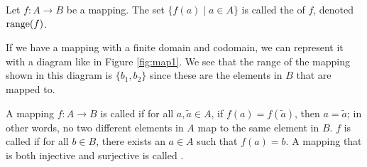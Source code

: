 \begin{definition}
Let $ f:A\to B $ be a mapping. The set $ \{f(a)\mid a\in A\} $ is called the  of $ f $, denoted $ \operatorname{range}(f) $.
\end{definition}

\begin{SCfigure}[0.8][hb]
\centering
{}
\caption{An example of a mapping from $ A=\{a_1,a_2,a_3\} $ to $ B=\{b_1,b_2,b_3\} $}
\label{fig:map1}
\end{SCfigure}

If we have a mapping with a finite domain and codomain, we can represent it with a diagram like in Figure \ref{fig:map1}. We see that the range of the mapping shown in this diagram is $ \{b_1,b_2\} $ since these are the elements in $ B $ that are mapped to.

\begin{definition}
A mapping $ f:A\to B $ is called  if for all $ a,\tilde{a}\in A $, if $ f(a)=f(\tilde{a}) $, then $ a=\tilde{a} $; in other words, no two different elements in $ A $ map to the same element in $ B $. $ f $ is called  if for all $ b\in B $, there exists an $ a\in A $ such that $ f(a)=b $. A mapping that is both injective and surjective is called .
\end{definition}

\begin{SCfigure}[0.8][ht]
\centering
{}
\caption{An example of a bijective mapping from $ A=\{a_1,a_2,a_3\} $ to $ B=\{b_1,b_2,b_3\} $}
\end{SCfigure}

